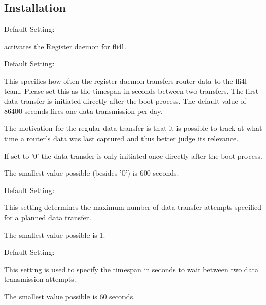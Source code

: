 \subsection{Installation}

\begin{description}


Default Setting: 

 activates the Register daemon for fli4l.


Default Setting: 

This specifies how often the register daemon transfers router data to the
fli4l team. Please set this as the timespan in seconds between two
transfers. The first data transfer is initiated directly after the
boot process. The default value of 86400 seconds fires one data
transmission per day.

The motivation for the regular data transfer is that it is possible to track
at what time a router's data was last captured and thus better judge its relevance.

If set to '0' the data transfer is only initiated once directly after the boot process.

The smallest value possible (besides '0') is 600 seconds.


Default Setting: 

This setting determines the maximum number of data transfer attempts
specified for a planned data transfer.

The smallest value possible is 1.


Default Setting: 

This setting is used to specify the timespan in seconds to wait between two data transmission attempts.

The smallest value possible is 60 seconds.

\end{description}
